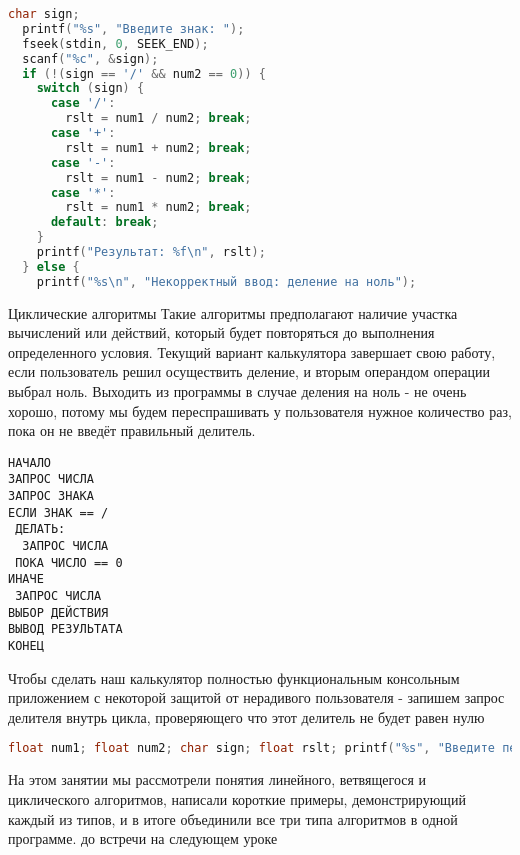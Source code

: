 \documentclass[fontsize=14bp]{report}
\begin{document}
\begin{lstlisting}[language=C,style=CCodeStyle]
  char sign;
  printf("%s", "Введите знак: "); 
  fseek(stdin, 0, SEEK_END); 
  scanf("%c", &sign);
  if (!(sign == '/' && num2 == 0)) { 
    switch (sign) { 
      case '/':
        rslt = num1 / num2; break;
      case '+':
        rslt = num1 + num2; break;
      case '-':
        rslt = num1 - num2; break;
      case '*':
        rslt = num1 * num2; break;
      default: break;
    }
    printf("Результат: %f\n", rslt); 
  } else { 
    printf("%s\n", "Некорректный ввод: деление на ноль");
\end{lstlisting}
  
Циклические алгоритмы
Такие алгоритмы предполагают наличие участка вычислений или действий, который будет повторяться до выполнения определенного условия. Текущий вариант калькулятора завершает свою работу, если пользователь решил осуществить деление, и вторым операндом операции выбрал ноль. Выходить из программы в случае деления на ноль - не очень хорошо, потому мы будем переспрашивать у пользователя нужное количество раз, пока он не введёт правильный делитель.
\begin{verbatim}
НАЧАЛО
ЗАПРОС ЧИСЛА
ЗАПРОС ЗНАКА
ЕСЛИ ЗНАК == /
 ДЕЛАТЬ:
  ЗАПРОС ЧИСЛА
 ПОКА ЧИСЛО == 0
ИНАЧЕ
 ЗАПРОС ЧИСЛА
ВЫБОР ДЕЙСТВИЯ
ВЫВОД РЕЗУЛЬТАТА
КОНЕЦ
\end{verbatim}
Чтобы сделать наш калькулятор полностью функциональным консольным приложением с некоторой защитой от нерадивого пользователя - запишем  запрос делителя внутрь цикла, проверяющего что этот делитель не будет равен нулю

\begin{lstlisting}[language=C,style=CCodeStyle]
  float num1; float num2; char sign; float rslt; printf("%s", "Введите первое число: "); scanf("%f", &num1); printf("%s", "Введите знак: "); fseek(stdin, 0, SEEK_END); scanf("%c", &sign); if (sign == '/') { do { printf("%s", "Введите второе число: "); scanf("%f", &num2); } while (num2 == 0); } else { printf("%s", "Введите второе число: "); scanf("%f", &num2); } switch (sign) { case '/': rslt = num1 / num2; break; case '+': rslt = num1 + num2; break; case '-': rslt = num1 - num2; break; case '*': rslt = num1 * num2; break; default: break; } printf("Результат: %f\n", rslt);
\end{lstlisting}

На этом занятии мы рассмотрели понятия линейного, ветвящегося и циклического алгоритмов, написали короткие примеры, демонстрирующий каждый из типов, и в итоге объединили все три типа алгоритмов в одной программе. до встречи на следующем уроке
\end{document}
